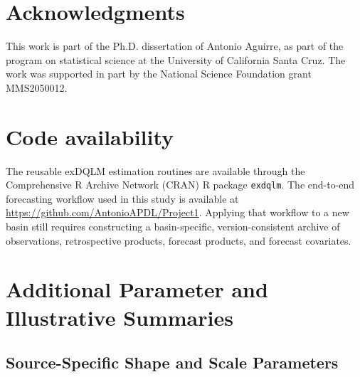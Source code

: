 \documentclass[APA,STIX1COL]{WileyNJD-v2}
\begin{document}
\section*{Acknowledgments}

This work is part of the Ph.D. dissertation of Antonio Aguirre, as part of 
the program on statistical science at the University of
California Santa Cruz. The work was supported in part by the National Science
Foundation grant MMS2050012.

\section*{Code availability}

The reusable exDQLM estimation routines are available through the Comprehensive R Archive Network (CRAN) R package \texttt{exdqlm}. The end-to-end forecasting workflow used in this study is available at \url{https://github.com/AntonioAPDL/Project1}. Applying that workflow to a new basin still requires constructing a basin-specific, version-consistent archive of observations, retrospective products, forecast products, and forecast covariates.






\clearpage


\appendix

\section{Additional Parameter and Illustrative Summaries}
\label{app:extras}

\subsection{Source-Specific Shape and Scale Parameters}
\label{app:sourceparams}
\end{document}
